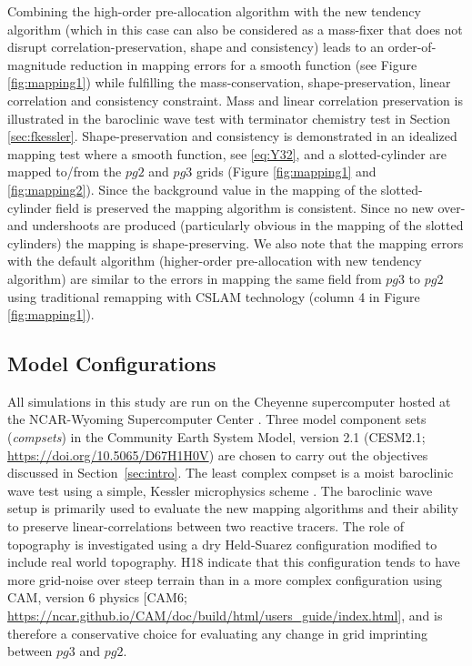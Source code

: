 \documentclass[draft,linenumbers]{agujournal}
\begin{document}
Combining the high-order pre-allocation algorithm with the new tendency algorithm (which in this case can also be considered as a mass-fixer that does not disrupt correlation-preservation, shape and consistency) leads to an order-of-magnitude reduction in mapping errors for a smooth function (see Figure \ref{fig:mapping1}) while fulfilling the mass-conservation, shape-preservation, linear correlation and consistency  constraint. Mass and linear correlation preservation is illustrated in the baroclinic wave test with terminator chemistry test in Section \ref{sec:fkessler}. Shape-preservation and consistency is demonstrated in an idealized mapping test where a smooth function, see \eqref{eq:Y32}, and a slotted-cylinder \citep[see equation 12 in ][]{LSPT2012GMD} are mapped to/from the $pg2$ and $pg3$ grids (Figure \ref{fig:mapping1} and \ref{fig:mapping2}). Since the background value in the mapping of the slotted-cylinder field is preserved the mapping algorithm is consistent. Since no new over- and undershoots are produced (particularly obvious in the mapping of the slotted cylinders) the mapping is shape-preserving. We also note that the mapping errors with the default algorithm (higher-order pre-allocation with new tendency algorithm) are similar to the errors in mapping the same field from $pg3$ to $pg2$ using traditional remapping with CSLAM technology (column 4 in Figure \ref{fig:mapping1}).

\subsection{Model Configurations}\label{sec:config}

All simulations in this study are run on the Cheyenne supercomputer hosted at the NCAR-Wyoming Supercomputer Center \citep{AMPproj}. Three model component sets ({\em{compsets}}) in the Community Earth System Model, version 2.1 (CESM2.1; \url{https://doi.org/10.5065/D67H1H0V}) are chosen to carry out the objectives discussed in Section~\ref{sec:intro}. The least complex compset is a moist baroclinic wave test using a simple, Kessler microphysics scheme \citep[$FKESSLER$ compset;][]{LetAl2018JAMES}. The baroclinic wave setup is primarily used to evaluate the new mapping algorithms and their ability to preserve linear-correlations between two reactive tracers. The role of topography is investigated using a dry Held-Suarez configuration \citep[$FHS94$ compset;][]{HS1994} modified to include real world topography. H18 indicate that this configuration tends to have more grid-noise over steep terrain than in a more complex configuration using CAM, version 6 physics [CAM6; \url{https://ncar.github.io/CAM/doc/build/html/users_guide/index.html}], and is therefore a conservative choice for evaluating any change in grid imprinting between $pg3$ and $pg2$. 
\end{document}
